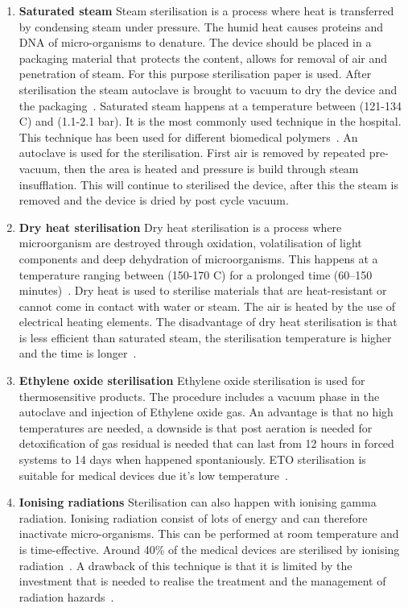\documentclass[whitelogo]{tudelft-report}
\begin{document}
{\begin{enumerate}
	\item \textbf{Saturated steam} Steam sterilisation is a process where heat is transferred by condensing steam under pressure. The humid
	heat causes proteins and DNA of micro-organisms to denature. The device should be placed in a packaging material that protects the content, allows for removal of air and penetration of steam. For this purpose sterilisation paper is used. After sterilisation the steam autoclave is brought to vacuum to dry the device and the packaging~\cite{bouwman2015practical}. Saturated steam happens at a temperature between (121-134 \degree C) and (1.1-2.1 bar). It is the most commonly used technique in the hospital. This technique has been used for different biomedical polymers~\cite{tessarolo2008sterilization}. An autoclave is used for the sterilisation. First air is removed by repeated pre-vacuum, then the area is heated and pressure is build through steam insufflation. This will continue to sterilised the device, after this the steam is removed and the device is dried by post cycle vacuum.  
	\item \textbf{Dry heat sterilisation} Dry heat sterilisation is a process where microorganism are destroyed through oxidation, volatilisation of light components and deep dehydration of microorganisms. This happens at a temperature ranging between (150-170 \degree C) for a prolonged time (60–150 minutes)~\cite{tessarolo2008sterilization}. Dry heat is used to sterilise materials that are heat-resistant or cannot come in contact with water or steam. The air is heated by the use of
	electrical heating elements. The disadvantage of dry heat sterilisation is that is less efficient than saturated steam, the sterilisation temperature is higher and the time is longer~\cite{bouwman2015practical}. 
	\item \textbf{Ethylene oxide sterilisation} Ethylene oxide sterilisation is used for thermosensitive products. The procedure includes a vacuum phase in the autoclave and injection of Ethylene oxide gas. An advantage is that no high temperatures are needed, a downside is that post aeration is needed for detoxification of gas residual is needed that can last from 12 hours in forced systems to 14 days when happened spontaniously. ETO sterilisation is suitable for medical devices due it's low temperature~\cite{tessarolo2008sterilization}.  %
	\item \textbf{Ionising radiations} Sterilisation can also happen with ionising gamma radiation. Ionising radiation consist of lots of energy and can therefore inactivate micro-organisms. This can be performed at room temperature and is time-effective. Around 40\% of the medical devices are sterilised by ionising radiation~\cite{bouwman2015practical}. A drawback of this technique is that it is limited by the investment that is needed to realise the treatment and the management of radiation hazards~\cite{tessarolo2008sterilization}.

\end{enumerate}}
\end{document}
